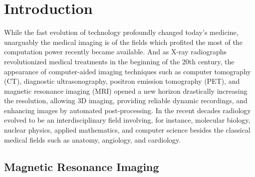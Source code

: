 \chapter{Introduction}\label{chapter:introduction}

While the fast evolution of technology profoundly changed today's medicine, unarguably the medical imaging is of the fields which profited the most of the computation power recently became available. And as X-ray radiographs revolutionized medical treatments in the beginning of the 20th century,  the appearance of computer-aided imaging techniques such as computer tomography (CT), diagnostic ultrasonography, positron emission tomography (PET), and magnetic resonance imaging (MRI) opened a new horizon drastically increasing the resolution, allowing 3D imaging, providing reliable dynamic recordings, and enhancing images by automated post-processing. In the recent decades radiology evolved to be an interdisciplinary field involving, for instance, molecular biology, nuclear physics, applied mathematics, and computer science besides the classical medical fields such as anatomy, angiology, and cardiology.

\section{Magnetic Resonance Imaging}

